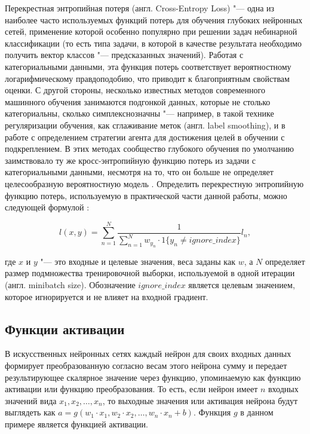 \documentclass[bachelor, och, coursework]{SCWorks}
\begin{document}
        Перекрестная энтропийная потеря (англ. Cross-Entropy Loss) "--- одна из
        наиболее часто используемых функций потерь для обучения глубоких
        нейронных сетей, применение которой особенно популярно при решении задач
        небинарной классификации (то есть типа задачи, в которой в качестве
        результата необходимо получить вектор классов "--- предсказанных
        значений). Работая с категориальными данными, эта функция потерь
        соответствует вероятностному логарифмическому правдоподобию, что
        приводит к благоприятным свойствам оценки. С другой стороны, несколько
        известных методов современного машинного обучения занимаются подгонкой
        данных, которые не столько категориальны, сколько симплекснозначны "---
        например, в такой технике регуляризации обучения, как сглаживание меток
        (англ. label smoothing), и в работе с определением стратегии агента для
        достижения целей в обучении с подкреплением. В этих методах сообщество
        глубокого обучения по умолчанию заимствовало ту же кросс-энтропийную
        функцию потерь из задачи с категориальными данными, несмотря на то, что
        он больше не определяет целесообразную вероятностную модель
        \cite{celoss2}. Определить перекрестную энтропийную функцию потерь,
        используемую в практической части данной работы, можно следующей
        формулой \cite{torchcel}:

        \[l(x, y) = \sum_{n = 1}^{N} \frac{1}{\sum_{n = 1}^{N} w_{y_n} \cdot 1
        \{y_n \neq ignore\_index \}} l_n , \]
    
        где $x$ и $y$ "--- это входные и целевые значения, веса заданы как $w$,
        а $N$ определяет размер подмножества тренировочной выборки, используемой
        в одной итерации (англ. minibatch size). Обозначение $ignore\_index$
        является целевым значением, которое игнорируется и не влияет на входной
        градиент.

    \subsection{Функции активации}

        В искусственных нейронных сетях каждый нейрон для своих входных данных
        формирует преобразованную согласно весам этого нейрона сумму и передает
        результирующее скалярное значение через функцию, упоминаемую как функцию
        активации или функцию преобразования. То есть, если нейрон имеет $n$
        входных значений вида $x_1, x_2, \ldots, x_n$, то выходные значения или
        активация нейрона будут выглядеть как $a = g(w_1 \cdot x_1, w_2 \cdot
        x_2, \ldots, w_n \cdot x_n + b)$. Функция $g$ в данном примере является
        функцией активации.
        
\end{document}
